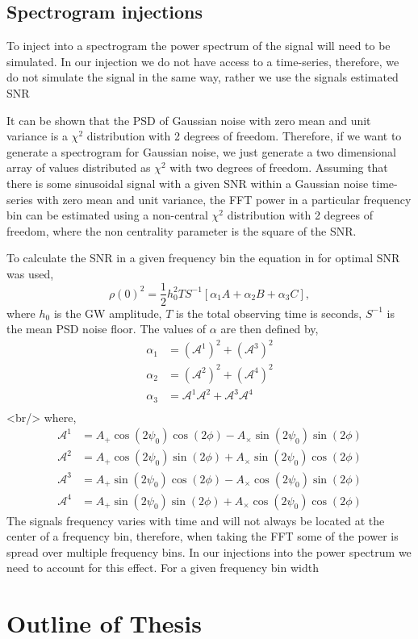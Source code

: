 \subsection{Spectrogram injections}

To inject into a spectrogram the power spectrum of the signal will need to be simulated. In our injection we do not have access to a time-series, therefore, we do not simulate the signal in the same way, rather we use the signals estimated \ac{SNR}

It can be shown that the \ac{PSD} of Gaussian noise with zero mean and unit variance is a $\chi^2$ distribution with 2 degrees of freedom. Therefore, if we want to generate a spectrogram for Gaussian noise, we just generate a two dimensional array of values distributed as $\chi^2$ with two degrees of freedom.
Assuming that there is some sinusoidal signal with a given \ac{SNR} within a Gaussian noise time-series with zero mean and unit variance, the \ac{FFT} power in a particular frequency bin can be estimated using a non-central $\chi^2$ distribution with 2 degrees of freedom, where the non centrality parameter is the square of the \ac{SNR}. 

To calculate the \ac{SNR} in a given frequency bin the equation in \cite{Prix2007} for optimal \ac{SNR} was used,
\begin{equation}
    \rho(0)^2 = \frac{1}{2}h_0^2 T S^{-1} \left[ \alpha_1 A + \alpha_2 B + \alpha_3 C \right],
\end{equation}
where $h_0$ is the \ac{GW} amplitude, $T$ is the total observing time is seconds, $S^{-1}$ is the mean \ac{PSD} noise floor. The values of $\alpha$ are then defined by,
\begin{equation}
\begin{split}
\alpha_1 &= (\mathcal{A}^1)^2 + (\mathcal{A}^3)^2\\
\alpha_2 &= (\mathcal{A}^2)^2 + (\mathcal{A}^4)^2 \\
\alpha_3 &= \mathcal{A}^1\mathcal{A}^2 + \mathcal{A}^3\mathcal{A}^4 \\
\end{split}
\end{equation}
<br/>
where,
\begin{equation}
\begin{split}
\mathcal{A}^1 &= A_{+}\cos(2\psi_0)\cos(2\phi) - A_{\times}\sin(2\psi_0)\sin(2\phi) \\
\mathcal{A}^2 &= A_{+}\cos(2\psi_0)\sin(2\phi) + A_{\times}\sin(2\psi_0)\cos(2\phi) \\
\mathcal{A}^3 &= A_{+}\sin(2\psi_0)\cos(2\phi) - A_{\times}\cos(2\psi_0)\sin(2\phi) \\
\mathcal{A}^4 &= A_{+}\sin(2\psi_0)\sin(2\phi) + A_{\times}\cos(2\psi_0)\cos(2\phi) 
\end{split}
\end{equation}
The signals frequency varies with time and will not always be located at the center of a frequency bin, therefore, when taking the \ac{FFT} some of the power is spread over multiple frequency bins. 
In our injections into the power spectrum we need to account for this effect. 
For a given frequency bin width 

\section{Outline of Thesis}



